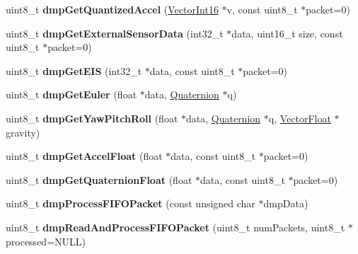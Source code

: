\begin{DoxyCompactItemize}
\item 
\mbox{\label{class_m_p_u6050_a584cb864d829606f98df54c8962ca934}} 
uint8\+\_\+t {\bfseries dmp\+Get\+Quantized\+Accel} (\mbox{\hyperlink{class_vector_int16}{Vector\+Int16}} $\ast$v, const uint8\+\_\+t $\ast$packet=0)
\item 
\mbox{\label{class_m_p_u6050_a72afcbd02dbc9d2cd02a9b29dfa1e8f2}} 
uint8\+\_\+t {\bfseries dmp\+Get\+External\+Sensor\+Data} (int32\+\_\+t $\ast$data, uint16\+\_\+t size, const uint8\+\_\+t $\ast$packet=0)
\item 
\mbox{\label{class_m_p_u6050_aa57210108896ae4ed01147fac40592e8}} 
uint8\+\_\+t {\bfseries dmp\+Get\+E\+IS} (int32\+\_\+t $\ast$data, const uint8\+\_\+t $\ast$packet=0)
\item 
\mbox{\label{class_m_p_u6050_ac2bac2a88ecdca4e0aa399c9d93e4cc3}} 
uint8\+\_\+t {\bfseries dmp\+Get\+Euler} (float $\ast$data, \mbox{\hyperlink{class_quaternion}{Quaternion}} $\ast$q)
\item 
\mbox{\label{class_m_p_u6050_a4e8c0d64e9ad7266b1a7970bb38d6b27}} 
uint8\+\_\+t {\bfseries dmp\+Get\+Yaw\+Pitch\+Roll} (float $\ast$data, \mbox{\hyperlink{class_quaternion}{Quaternion}} $\ast$q, \mbox{\hyperlink{class_vector_float}{Vector\+Float}} $\ast$gravity)
\item 
\mbox{\label{class_m_p_u6050_a6045ca343e5b35fc454f4793b3f8eaf9}} 
uint8\+\_\+t {\bfseries dmp\+Get\+Accel\+Float} (float $\ast$data, const uint8\+\_\+t $\ast$packet=0)
\item 
\mbox{\label{class_m_p_u6050_ab9021b9acffd400ac6d1b0d78e1a633c}} 
uint8\+\_\+t {\bfseries dmp\+Get\+Quaternion\+Float} (float $\ast$data, const uint8\+\_\+t $\ast$packet=0)
\item 
\mbox{\label{class_m_p_u6050_a6bfac470414ede55359fc5978de72548}} 
uint8\+\_\+t {\bfseries dmp\+Process\+F\+I\+F\+O\+Packet} (const unsigned char $\ast$dmp\+Data)
\item 
\mbox{\label{class_m_p_u6050_acd224b46caa5821bb1815ae0bd7ae326}} 
uint8\+\_\+t {\bfseries dmp\+Read\+And\+Process\+F\+I\+F\+O\+Packet} (uint8\+\_\+t num\+Packets, uint8\+\_\+t $\ast$processed=N\+U\+LL)

\end{DoxyCompactItemize}
